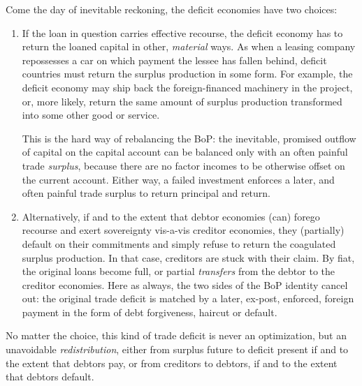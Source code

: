 \documentclass[11pt,a4paper,oneside,openright]{article}
\begin{document}
\begin{description}
\begin{enumerate}
		Come the day of inevitable reckoning, the deficit economies have two choices:
		\begin{enumerate}
			\item If the loan in question carries effective recourse, the deficit economy has to return the loaned capital in other, \emph{material} ways. As when a leasing company repossesses a car on which payment the lessee has fallen behind, deficit countries must return the surplus production in some form. For example, the deficit economy may ship back the foreign-financed machinery in the project, or, more likely, return the same amount of surplus production transformed into some other good or service. 
			
			This is the hard way of rebalancing the \gls{BoP}: the inevitable, promised outflow of capital on the capital account can be balanced only with an often painful trade \emph{surplus}, because there are no factor incomes to be otherwise offset on the current account. Either way, a failed investment enforces a later, and often painful trade surplus to return principal and return.

			\item Alternatively, if and to the extent that debtor economies (can) forego recourse and exert sovereignty vis-a-vis creditor economies, they (partially) default on their commitments and simply refuse to return the coagulated surplus production. In that case, creditors are stuck with their claim. By fiat, the original loans become full, or partial \emph{transfers} from the debtor to the creditor economies. Here as always, the two sides of the \gls{BoP} identity cancel out: the original trade deficit is matched by a later, ex-post, enforced, foreign payment in the form of debt forgiveness, haircut or default.
		\end{enumerate}

		No matter the choice, this kind of trade deficit is never an optimization, but an unavoidable \emph{redistribution}, either from surplus future to deficit present if and to the extent that debtors pay, or from creditors to debtors, if and to the extent that debtors default.
		

\end{enumerate}
\end{description}
\end{document}

